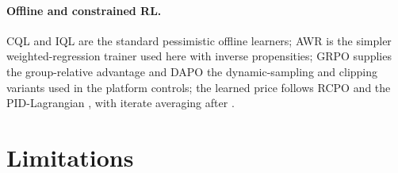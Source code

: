 \documentclass[10pt]{article}
\begin{document}
\paragraph{Offline and constrained RL.} CQL \citep{kumar2020cql} and IQL \citep{kostrikov2021iql} are the standard pessimistic offline learners; AWR \citep{peng2019awr} is the simpler weighted-regression trainer used here with inverse propensities; GRPO \citep{shao2024grpo} supplies the group-relative advantage and DAPO \citep{dapo2025} the dynamic-sampling and clipping variants used in the platform controls; the learned price follows RCPO \citep{tessler2018rcpo} and the PID-Lagrangian \citep{stooke2020pid}, with iterate averaging after \citet{nedic2009saddle}.

\section{Limitations}
\label{app:limitations}
\end{document}
